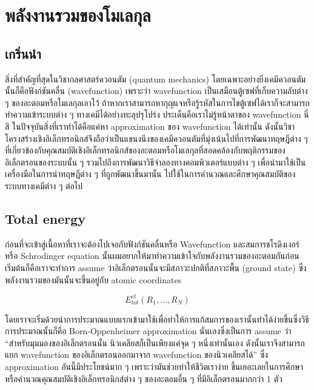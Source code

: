 
\chapter{พลังงานรวมของโมเลกุล}

\section{เกริ่นนำ}

สิ่งที่สำคัญที่สุดในวิชากลศาสตร์ควอนตัม (quantum mechanics) โดยเฉพาะอย่างยิ่งเคมีควอนตัมนั้นก็คือฟังก์ชันคลื่น 
(wavefunction) เพราะว่า wavefunction เป็นเสมือนตู้เซฟที่เก็บความลับต่าง ๆ ของอะตอมหรือโมเลกุลเอาไว้
ถ้าหากเราสามารถหากุญแจหรือรู้รหัสในการไขตู้เซฟได้เราก็จะสามารถทำความเข้าระบบต่าง ๆ ทางเคมีได้อย่างทะลุปรุโปร่ง 
ประเด็นคือเราไม่รู้หน้าตาของ wavefunction นี่สิ ในปัจจุบันสิ่งที่เราทำได้คือแค่หา approximation ของ wavefunction 
ได้เท่านั้น ดังนั้นวิชาโครงสร้างเชิงอิเล็กทรอนิกส์จึงถือว่าเป็นแขนงนึงของเคมีควอนตัมที่มุ่งเน้นไปที่การพัฒนาทฤษฎีต่าง ๆ 
ที่เกี่ยวข้องกับคุณสมบัติเชิงอิเล็กทรอนิกส์ของอะตอมหรือโมเลกุลที่สอดคล้องกับพฤติกรรมของอิเล็กตรอนของระบบนั้น ๆ 
รวมไปถึงการพัฒนาวิธีจำลองทางคอมพิวเตอร์แบบต่าง ๆ เพื่อนำมาใช้เป็นเครื่องมือในการนำทฤษฎีต่าง ๆ ที่ถูกพัฒนาขึ้นมานั้น 
ไปใช้ในการคำนวณและศึกษาคุณสมบัติของระบบทางเคมีต่าง ๆ ต่อไป

\section{Total energy}

ก่อนที่จะเข้าสู่เนื้อหาที่เราจะต้องไปเจอกับฟังก์ชันคลื่นหรือ Wavefunction และสมการชโรดิงเงอร์หรือ Schrodinger 
equation นั้นผมอยากให้มาทำความเข้าใจกับพลังงานรวมของอะตอมกันก่อน เริ่มต้นก็คือเราจะทำการ assume 
ว่าอิเล็กตรอนนั้นจะมีสภาวะปกติที่สภาวะพื้น (ground state) ซึ่งพลังงานรวมของมันนั้นจะขึ้นอยู่กับ atomic coordinates

\begin{equation}
    E^{el}_{tot}(R_{1}, \dots, R_{N})
\end{equation}

โดยเราจะเริ่มด้วยนำการประมาณแบบแรกเข้ามาใช้เพื่อทำให้การแก้สมการของเรานั้นทำได้ง่ายขึ้นซึ่งวิธีการประมาณนั้นก็คือ 
Born-Oppenheimer approximation นั่นเองซึ่งเป็นการ assume ว่า \enquote{สำหรับมุมมองของอิเล็กตรอนนั้น 
นิวเคลียสก็เป็นเพียงแค่จุด ๆ หนึ่งเท่านั้นเอง ดังนั้นเราจึงสามารถแยก wavefunction ของอิเล็กตรอนออกมาจาก 
wavefunction ของนิวเคลียสได้} ซึ่ง approximation อันนี้มีประโยชน์มาก ๆ เพราะว่ามันช่วยทำให้ชีวิตเราง่าย%
ขึ้นเยอะเลยในการศึกษาหรือคำนวณคุณสมบัติเชิงอิเล็กทรอนิกส์ต่าง ๆ ของอะตอมอื่น ๆ ที่มีอิเล็กตรอนมากกว่า 1 ตัว

